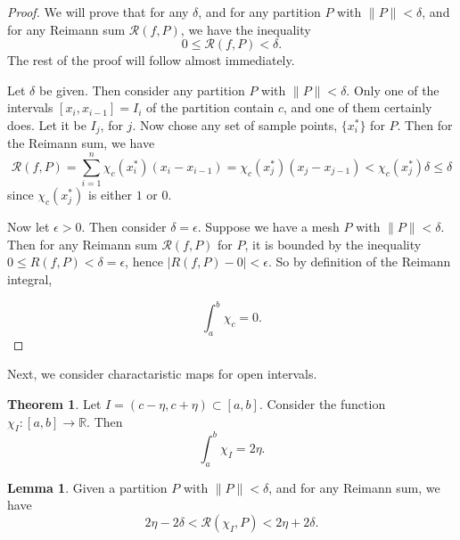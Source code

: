 \documentclass[12pt, letterpaper]{article}
\newcommand{\R}{\mathbb{R}}
\newcommand\norm[1]{\lVert#1\rVert} %
\newcommand\rsum[2]{\mathcal{R} (#1,#2)} %
\theoremstyle{definition}
\newtheorem{theorem}{Theorem}
\newtheorem{lemma}{Lemma}
\begin{document}
    \begin{proof}
        We will prove that for any $\delta$, and for any partition $P$ with $\norm{P} < \delta$, and for any Reimann sum $\rsum{f}{P}$, we have the inequality
        \[
            0\le \rsum{f}{P} < \delta.
            \]
        The rest of the proof will follow almost immediately.

        Let $\delta$ be given. Then consider any partition $P$ with $\norm{P} < \delta$. Only one of the intervals $[x_i, x_{i-1}] = I_i$ of the partition contain $c$, and one of them certainly does. Let it be $ I_j$, for $j$. Now chose any set of sample points, $ \{x_i^*\} $ for $P$. Then for the Reimann sum, we have 
        \[\rsum{f}{P} = \sum_{i = 1}^n\chi_c(x_i^*)(x_i - x_{i-1}) = \chi_c(x_j^*)(x_j - x_{j - 1}) < \chi_c(x_j^*)\delta \le \delta\]
        since $\chi_c(x_j^*)$ is either $1$ or $0$. 

        Now let $\epsilon > 0$. Then consider $\delta = \epsilon$. Suppose we have a mesh $P$ with $\norm{P} < \delta$. Then for any Reimann sum $\rsum{f}{P}$ for $P$, it is bounded by the inequality $ 0 \le R(f,P) < \delta  = \epsilon$, hence $|R(f,P) - 0| < \epsilon$. So by definition of the Reimann integral,
        
        \[
            \int_{a}^{b} \chi_c = 0.
            \]
    \end{proof}

    Next, we consider charactaristic maps for open intervals. 

    
    \begin{theorem}
        Let $I = (c - \eta, c + \eta) \subset [a,b]$. Consider the function $ \chi_I:[a,b] \to \R$. Then 
        \[
            \int_a^b \chi_I = 2\eta.
            \]
    \end{theorem}

    \begin{lemma}\label{sumBounded}
        Given a partition $P$ with $\norm{P} < \delta$, and for any Reimann sum, we have
        \[
            2\eta - 2\delta < \rsum{\chi_I}{P} < 2\eta + 2\delta.
            \]
    \end{lemma}
\end{document}
